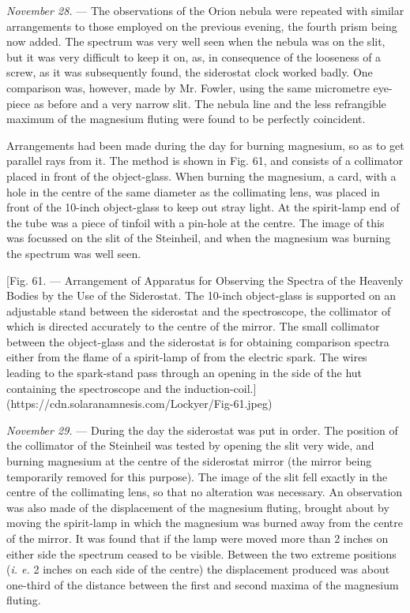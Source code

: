 \documentclass[a4paper, 12pt, oneside, polutonikogreek, english]{article}
\begin{document}
\emph{November 28.} --- The observations of the Orion nebula were repeated with similar arrangements to those employed on the previous evening, the fourth prism being now added. The spectrum was very well seen when the nebula was on the slit, but it was very difficult to keep it on, as, in consequence of the looseness of a screw, as it was subsequently found, the siderostat clock worked badly. One comparison was, however, made by Mr. Fowler, using the same micrometre eye-piece as before and a very narrow slit. The nebula line and the less refrangible maximum of the magnesium fluting were found to be perfectly coincident.

Arrangements had been made during the day for burning magnesium, so as to get parallel rays from it. The method is shown in Fig. 61, and consists of a collimator placed in front of the object-glass. When burning the magnesium, a card, with a hole in the centre of the same diameter as the collimating lens, was placed in front of the 10-inch object-glass to keep out stray light. At the spirit-lamp end of the tube was a piece of tinfoil with a pin-hole at the centre. The image of this was focussed on the slit of the Steinheil, and when the magnesium was burning the spectrum was well seen.

[Fig. 61. --- Arrangement of Apparatus for Observing the Spectra of the Heavenly Bodies by the Use of the Siderostat. The 10-inch object-glass is supported on an adjustable stand between the siderostat and the spectroscope, the collimator of which is directed accurately to the centre of the mirror. The small collimator between the object-glass and the siderostat is for obtaining comparison spectra either from the flame of a spirit-lamp of from the electric spark. The wires leading to the spark-stand pass through an opening in the side of the hut containing the spectroscope and the induction-coil.](https://cdn.solaranamnesis.com/Lockyer/Fig-61.jpeg)

\emph{November 29.} --- During the day the siderostat was put in order. The position of the collimator of the Steinheil was tested by opening the slit very wide, and burning magnesium at the centre of the siderostat mirror (the mirror being temporarily removed for this purpose). The image of the slit fell exactly in the centre of the collimating lens, so that no alteration was necessary. An observation was also made of the displacement of the magnesium fluting, brought about by moving the spirit-lamp in which the magnesium was burned away from the centre of the mirror. It was found that if the lamp were moved more than 2 inches on either side the spectrum ceased to be visible. Between the two extreme positions (\emph{i. e.} 2 inches on each side of the centre) the displacement produced was about one-third of the distance between the first and second maxima of the magnesium fluting.
\end{document}
